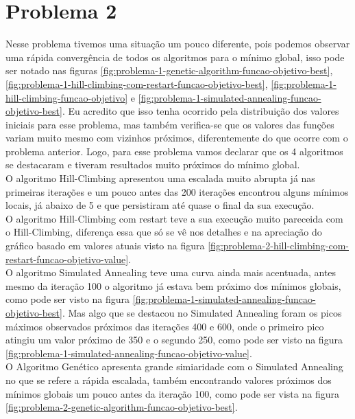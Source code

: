 \section[Problema 2]{Problema 2}

Nesse problema tivemos uma situação um pouco diferente, pois podemos observar uma rápida convergência de todos os algoritmos para o mínimo global, isso pode ser notado nas figuras \ref{fig:problema-1-genetic-algorithm-funcao-objetivo-best}, \ref{fig:problema-1-hill-climbing-com-restart-funcao-objetivo-best}, \ref{fig:problema-1-hill-climbing-funcao-objetivo} e \ref{fig:problema-1-simulated-annealing-funcao-objetivo-best}. Eu acredito que isso tenha ocorrido pela distribuição dos valores iniciais para esse problema, mas também verifica-se que os valores das funções variam muito mesmo com vizinhos próximos, diferentemente do que ocorre com o problema anterior. Logo, para esse problema vamos declarar que os 4 algoritmos se destacaram e tiveram resultados muito próximos do mínimo global. \\

O algoritmo Hill-Climbing apresentou uma escalada muito abrupta já nas primeiras iterações e um pouco antes das 200 iterações encontrou alguns mínimos locais, já abaixo de 5 e que persistiram até quase o final da sua execução. \\

O algoritmo Hill-Climbing com restart teve a sua execução muito pareceida com o Hill-Climbing, diferença essa que só se vê nos detalhes e na apreciação do gráfico basado em valores atuais visto na figura \ref{fig:problema-2-hill-climbing-com-restart-funcao-objetivo-value}. \\

O algoritmo Simulated Annealing teve uma curva ainda mais acentuada, antes mesmo da iteração 100 o algoritmo já estava bem próximo dos mínimos globais, como pode ser visto na figura \ref{fig:problema-1-simulated-annealing-funcao-objetivo-best}. Mas algo que se destacou no Simulated Annealing foram os picos máximos observados próximos das iterações 400 e 600, onde o primeiro pico atingiu um valor próximo de 350 e o segundo 250, como pode ser visto na figura \ref{fig:problema-1-simulated-annealing-funcao-objetivo-value}. \\

O Algoritmo Genético apresenta grande simiaridade com o Simulated Annealing no que se refere a rápida escalada, também encontrando valores próximos dos mínimos globais um pouco antes da iteração 100, como pode ser vista na figura \ref{fig:problema-2-genetic-algorithm-funcao-objetivo-best}.

